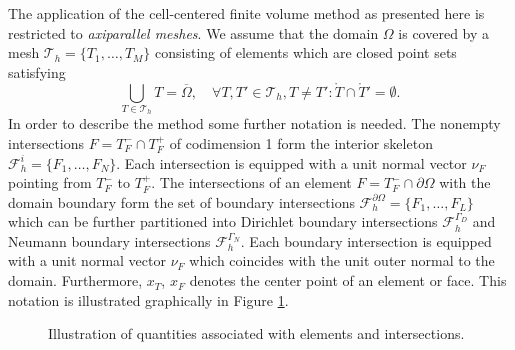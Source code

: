 \documentclass[a4paper,12pt]{article}
\begin{document}
The application of the cell-centered finite volume method as presented here is
restricted to \textit{axiparallel meshes}. We assume that  the domain $\Omega$ is covered by a mesh
$\mathcal{T}_h = \{T_1, \ldots, T_M\}$ consisting of elements
which are closed point sets satisfying
\begin{equation}
\bigcup_{T\in \mathcal{T}_h} T = \overline{\Omega}, \quad
\forall T, T' \in \mathcal{T}_h, T\neq T' : \mathring{T} \cap \mathring{T}' = \emptyset .
\end{equation}
In order to describe the method some further notation is needed.
The nonempty intersections $F = T_F^-\cap T_F^+$
of codimension 1 form the interior skeleton $\mathcal{F}_h^i=\{F_1,\ldots,F_N\}$.
Each intersection is equipped with a unit normal vector $\nu_F$ pointing from $T_F^-$ to $T_F^+$.
The intersections of an element $F=T_F^-\cap\partial\Omega$ with the domain
boundary form the set of boundary intersections $\mathcal{F}_h^{\partial\Omega}=
\{F_1,\ldots,F_L\}$ which can be further partitioned into
Dirichlet boundary intersections $\mathcal{F}_h^{\Gamma_D}$
and Neumann boundary intersections $\mathcal{F}_h^{\Gamma_N}$.
Each boundary intersection is equipped with a unit normal vector
$\nu_F$ which coincides with the unit outer normal to the domain.
Furthermore, $x_T$, $x_F$ denotes the center point of an element or face.
This notation is illustrated graphically in Figure \ref{fig:MeshNotation}.

\begin{figure}
\begin{center}
\hspace{0.1\textwidth}
\end{center}
\caption{Illustration of quantities associated with elements and intersections.}
\label{fig:MeshNotation}
\end{figure}
\end{document}
